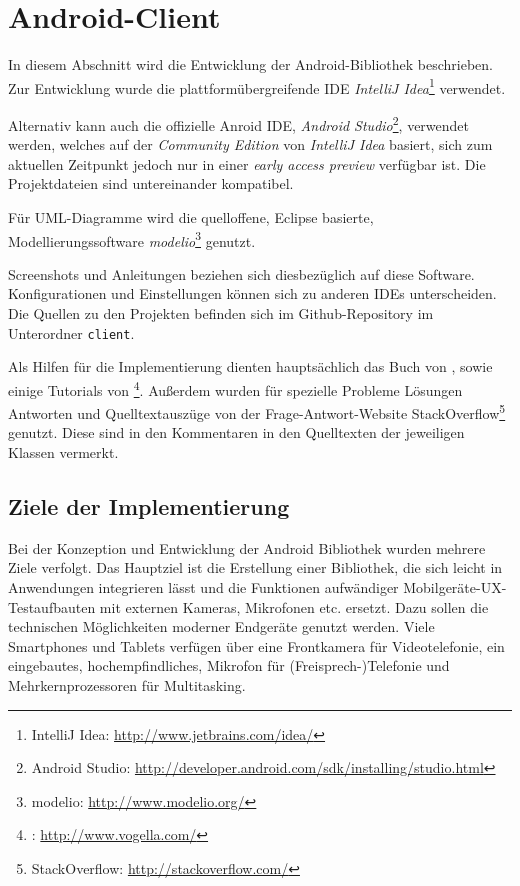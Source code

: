 \section{Android-Client}

In diesem Abschnitt wird die Entwicklung der Android-Bibliothek beschrieben. Zur Entwicklung wurde die plattformübergreifende IDE \emph{IntelliJ Idea}\footnote{IntelliJ Idea: \url{http://www.jetbrains.com/idea/}} verwendet.

Alternativ kann auch die offizielle Anroid \ac{IDE}, \emph{Android Studio}\footnote{Android Studio: \url{http://developer.android.com/sdk/installing/studio.html}}, verwendet werden, welches auf der \emph{Community Edition} von \emph{IntelliJ Idea} basiert, sich zum aktuellen Zeitpunkt jedoch nur in einer \emph{early access preview} verfügbar ist.
Die Projektdateien sind untereinander kompatibel.

Für UML-Diagramme wird die quelloffene, Eclipse basierte, Modellierungssoftware \emph{modelio}\footnote{modelio: \url{http://www.modelio.org/}} genutzt.

Screenshots und Anleitungen beziehen sich diesbezüglich auf diese Software. Konfigurationen und Einstellungen können sich zu anderen IDEs unterscheiden.
Die Quellen zu den Projekten befinden sich im Github-Repository im Unterordner \texttt{client}.

Als Hilfen für die Implementierung dienten hauptsächlich das Buch  von \citeauthor*{android4}, sowie einige Tutorials von \citeauthor*{androidvogella}\footnote{\citeauthor*{androidvogella}: \url{http://www.vogella.com/}}.
Außerdem wurden für spezielle Probleme Lösungen Antworten und Quelltextauszüge von der Frage-Antwort-Website StackOverflow\footnote{StackOverflow: \url{http://stackoverflow.com/}} genutzt.
Diese sind in den Kommentaren in den Quelltexten der jeweiligen Klassen vermerkt.


\subsection{Ziele der Implementierung}
Bei der Konzeption und Entwicklung der Android Bibliothek wurden mehrere Ziele verfolgt.
Das Hauptziel ist die Erstellung einer Bibliothek, die sich leicht in Anwendungen integrieren lässt und die Funktionen aufwändiger Mobilgeräte-\ac{UX}-Testaufbauten mit externen Kameras, Mikrofonen etc. ersetzt.
Dazu sollen die technischen Möglichkeiten moderner Endgeräte genutzt werden.
Viele Smartphones und Tablets verfügen über eine Frontkamera für Videotelefonie, ein eingebautes, hochempfindliches, Mikrofon für (Freisprech-)Telefonie und Mehrkernprozessoren für Multitasking.

